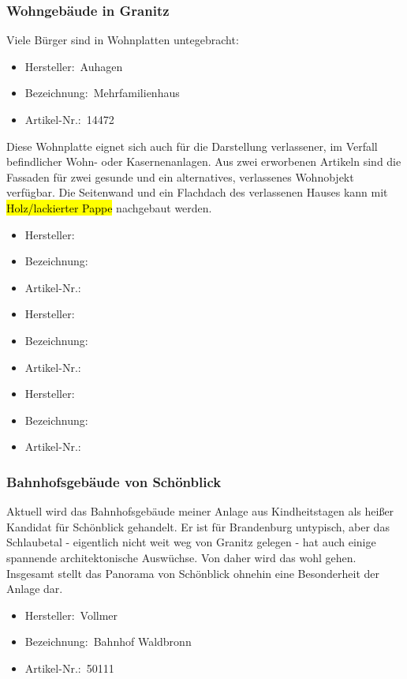 \subsubsection{Wohngeb\"aude in Granitz}

Viele B\"urger sind in Wohnplatten untegebracht:
\begin{itemize}
	\item[] Hersteller:~Auhagen
	\item[] Bezeichnung:~Mehrfamilienhaus
	\item[] Artikel-Nr.:~14472
\end{itemize}
Diese Wohnplatte eignet sich auch f\"ur die Darstellung verlassener, im Verfall befindlicher Wohn- oder Kasernenanlagen.
Aus zwei erworbenen Artikeln sind die Fassaden f\"ur zwei gesunde und ein alternatives, verlassenes Wohnobjekt verf\"ugbar.
Die Seitenwand und ein Flachdach des verlassenen Hauses kann mit \hl{Holz/lackierter Pappe} nachgebaut werden.

\begin{itemize}
	\item[] Hersteller:~
	\item[] Bezeichnung:~
	\item[] Artikel-Nr.:~
\end{itemize}

\begin{itemize}
	\item[] Hersteller:~
	\item[] Bezeichnung:~
	\item[] Artikel-Nr.:~
\end{itemize}

\begin{itemize}
	\item[] Hersteller:~
	\item[] Bezeichnung:~
	\item[] Artikel-Nr.:~
\end{itemize}


\subsubsection{Bahnhofsgeb\"aude von Sch\"onblick}

Aktuell wird das Bahnhofsgeb\"aude meiner Anlage aus Kindheitstagen als hei{\ss}er Kandidat f\"ur Sch\"onblick gehandelt.
Er ist f\"ur Brandenburg untypisch, aber das Schlaubetal - eigentlich nicht weit weg von Granitz gelegen - hat auch einige spannende architektonische Ausw\"uchse.
Von daher wird das wohl gehen.
Insgesamt stellt das Panorama von Sch\"onblick ohnehin eine Besonderheit der Anlage dar.
\begin{itemize}
	\item[] Hersteller:~Vollmer
	\item[] Bezeichnung:~Bahnhof Waldbronn
	\item[] Artikel-Nr.:~50111 
\end{itemize}

